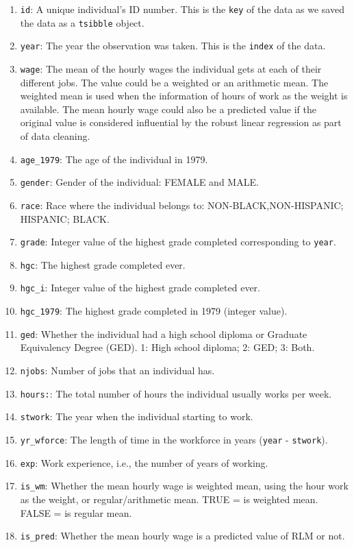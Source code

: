 \documentclass[12pt]{article}
\begin{document}
\begin{enumerate}
\def\labelenumi{\arabic{enumi}.}
\item
  \texttt{id}: A unique individual's ID number. This is the \texttt{key} of the data as we saved the data as a \texttt{tsibble} object.
\item
  \texttt{year}: The year the observation was taken. This is the \texttt{index} of the data.
\item
  \texttt{wage}: The mean of the hourly wages the individual gets at each of their different jobs. The value could be a weighted or an arithmetic mean. The weighted mean is used when the information of hours of work as the weight is available. The mean hourly wage could also be a predicted value if the original value is considered influential by the robust linear regression as part of data cleaning.
\item
  \texttt{age\_1979}: The age of the individual in 1979.
\item
  \texttt{gender}: Gender of the individual: FEMALE and MALE.
\item
  \texttt{race}: Race where the individual belongs to: NON-BLACK,NON-HISPANIC; HISPANIC; BLACK.
\item
  \texttt{grade}: Integer value of the highest grade completed corresponding to \texttt{year}.
\item
  \texttt{hgc}: The highest grade completed ever.
\item
  \texttt{hgc\_i}: Integer value of the highest grade completed ever.
\item
  \texttt{hgc\_1979}: The highest grade completed in 1979 (integer value).
\item
  \texttt{ged}: Whether the individual had a high school diploma or Graduate Equivalency Degree (GED). 1: High school diploma; 2: GED; 3: Both.
\item
  \texttt{njobs}: Number of jobs that an individual has.
\item
  \texttt{hours:}: The total number of hours the individual usually works per week.
\item
  \texttt{stwork}: The year when the individual starting to work.
\item
  \texttt{yr\_wforce}: The length of time in the workforce in years (\texttt{year} - \texttt{stwork}).
\item
  \texttt{exp}: Work experience, i.e., the number of years of working.
\item
  \texttt{is\_wm}: Whether the mean hourly wage is weighted mean, using the hour work as the weight, or regular/arithmetic mean. TRUE = is weighted mean. FALSE = is regular mean.
\item
  \texttt{is\_pred}: Whether the mean hourly wage is a predicted value of RLM or not.
\end{enumerate}
\end{document}
